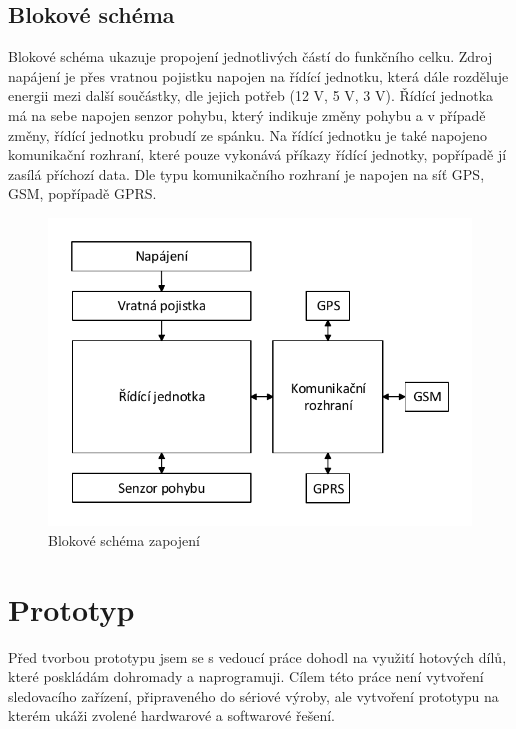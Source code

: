 \documentclass[FM,MP]{tulthesis}  %
\begin{document}
\section{Blokové schéma}
Blokové schéma ukazuje propojení jednotlivých částí do funkčního celku. Zdroj napájení je přes vratnou pojistku napojen na řídící jednotku, která dále rozděluje energii mezi další součástky, dle jejich potřeb (12 V, 5 V, 3 V). Řídící jednotka má na sebe napojen senzor pohybu, který indikuje změny pohybu a v případě změny, řídící jednotku probudí ze spánku. Na řídící jednotku je také napojeno komunikační rozhraní, které pouze vykonává příkazy řídící jednotky, popřípadě jí zasílá příchozí data. Dle typu komunikačního rozhraní je napojen na síť GPS, GSM, popřípadě GPRS.

\begin{figure}[H]
\begin{center}
\includegraphics[width=\textwidth]{graphs/schema_blokove.pdf}
\caption{Blokové schéma zapojení}
\label{image}
\end{center}
\end{figure}


\chapter{Prototyp}
Před tvorbou prototypu jsem se s vedoucí práce dohodl na využití hotových dílů, které poskládám dohromady a naprogramuji. Cílem této práce není vytvoření sledovacího zařízení, připraveného do sériové výroby, ale vytvoření prototypu na kterém ukáži zvolené hardwarové a softwarové řešení.
\end{document}
